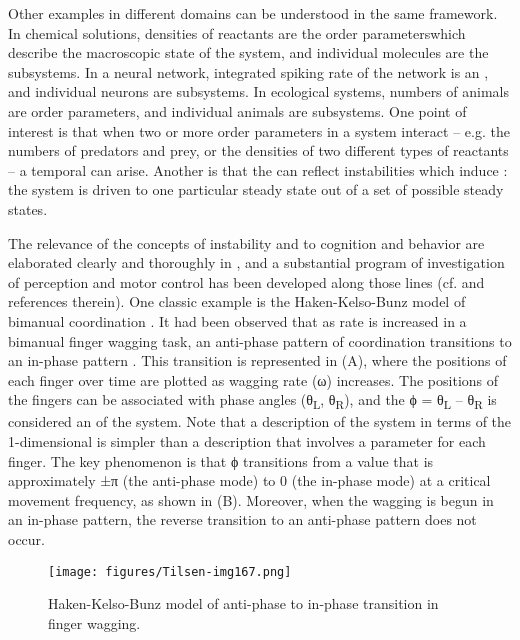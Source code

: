   Other examples in different domains can be understood in the same framework. In chemical solutions, densities of reactants are the order parameters\linebreak which describe the macroscopic state of the system, and individual molecules are the subsystems. In a neural network, integrated spiking rate of the network is an , and individual neurons are subsystems. In ecological systems, numbers of animals are order parameters, and individual animals are subsystems. One point of interest is that when two or more order parameters in a system interact -- e.g. the numbers of predators and prey, or the densities of two different types of reactants -- a temporal  can arise. Another is that the  can reflect instabilities which induce : the system is driven to one particular steady state out of a set of possible steady states. 

The relevance of the concepts of instability and  to cognition and behavior are elaborated clearly and thoroughly in \citet{Kelso1997}, and a substantial program of investigation of perception and motor control has been developed along those lines (cf. \citet{Kelso1997} and references therein). One classic example is the Haken-Kelso-Bunz model of bimanual coordination \citep{HakenEtAl1985,SchonerKelso1988}. It had been observed that as rate is increased in a bimanual finger wagging task, an anti-phase pattern of coordination transitions to an in-phase pattern \citep{KelsoEtAl1981}. This transition is represented in {}(A), where the positions of each finger over time are plotted as wagging rate (ω) increases. The positions of the fingers can be associated with phase angles (θ\textsubscript{L}, θ\textsubscript{R}), and the  ϕ = θ\textsubscript{L} – θ\textsubscript{R} is considered an  of the system. Note that a description of the system in terms of the 1-di\-men\-sional  is simpler than a description that involves a  parameter for each finger. The key phenomenon is that ϕ transitions from a value that is approximately ±π (the anti-phase mode) to 0 (the in-phase mode) at a critical movement frequency, as shown in {}(B). Moreover, when the wagging is begun in an in-phase pattern, the reverse transition to an anti-phase pattern does not occur.

  
\begin{figure}
\texttt{[image: figures/Tilsen-img167.png]}
\caption{Haken-Kelso-Bunz model of anti-phase to in-phase transition in finger wagging.}
\label{fig:8:1}
\end{figure}
 

